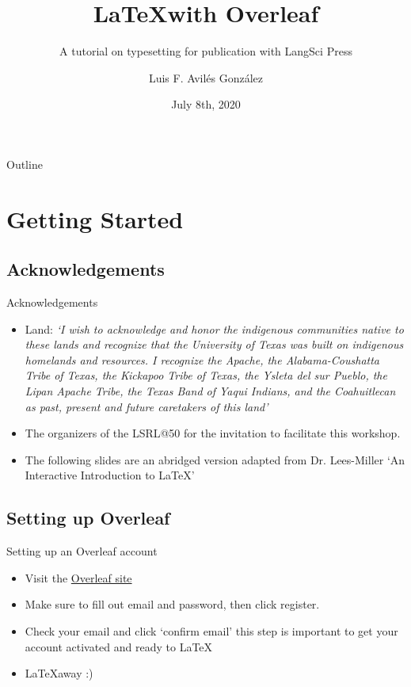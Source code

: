 \documentclass{beamer}
\title[LSRL@50:UT AUSTIN]{\LaTeX\space with Overleaf}
\subtitle{A tutorial on typesetting for publication with LangSci Press}
\author{Luis F. Avil\'es Gonz\'alez}
\date{July 8th, 2020}
\begin{document}
\begin{frame}
  \titlepage
\end{frame}

\begin{frame}{Outline}
  \tableofcontents
\end{frame}

\section{Getting Started}
\subsection{Acknowledgements}
\begin{frame}{Acknowledgements}
   \begin{itemize}
       \item Land: \textit{`I wish to acknowledge and honor the indigenous communities native to these lands and recognize that the University of Texas was built on indigenous homelands and resources. I recognize the Apache, the Alabama-Coushatta Tribe of Texas, the Kickapoo Tribe of Texas, the Ysleta del sur Pueblo, the Lipan Apache Tribe, the Texas Band of Yaqui Indians, and the Coahuitlecan as past, present and future caretakers of this land'}
       \item The organizers of the LSRL@50 for the invitation to facilitate this workshop.
       \item The following slides are an abridged version adapted from Dr. Lees-Miller `An Interactive Introduction to \LaTeX'
   \end{itemize} 
\end{frame}
\subsection{Setting up Overleaf}
\begin{frame}{Setting up an Overleaf account}
\begin{itemize}
    \item Visit the \href{https://www.overleaf.com/}{Overleaf site}
    \item Make sure to fill out email and password, then click register.
    \item Check your email and click ‘confirm email’ this step is important to get your account activated and ready to LaTeX
    \item \LaTeX \space away :) 
\end{itemize}
\end{frame}
\end{document}
